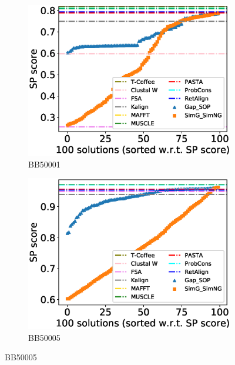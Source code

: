 \begin{figure}[!htbp]
	
	\begin{adjustwidth}{-1.5cm}{-1cm}
		\centering
		\begin{subfigure}{0.22\textwidth}
			\includegraphics[width=\columnwidth]{Figure/summary/precomputedInit/Balibase/BB50001_pairs_density_single_run_2}
			\caption{BB50001}
		\end{subfigure}	
		\begin{subfigure}{0.22\textwidth}
			\includegraphics[width=\columnwidth]{Figure/summary/precomputedInit/Balibase/BB50005_pairs_density_single_run_2}
			\caption{BB50005}
		\end{subfigure}

\end{adjustwidth}
\end{figure}
